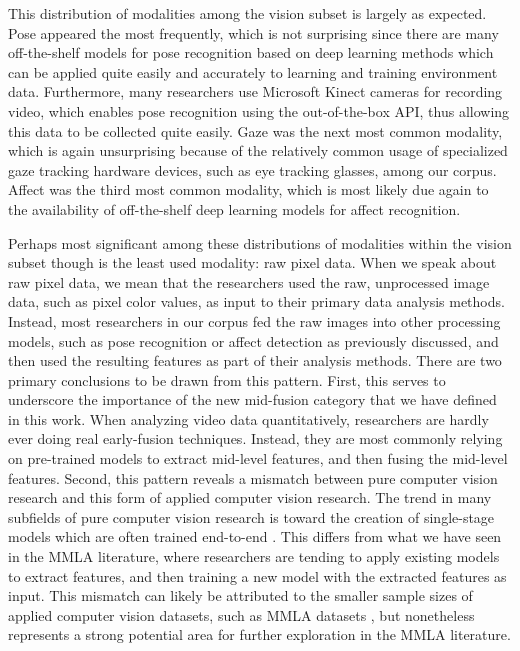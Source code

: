 \documentclass[manuscript,screen,review]{acmart}
\begin{document}
This distribution of modalities among the vision subset is largely as expected. Pose appeared the most frequently, which is not surprising since there are many off-the-shelf models for pose recognition based on deep learning methods which can be applied quite easily and accurately to learning and training environment data. Furthermore, many researchers use Microsoft Kinect cameras for recording video, which enables pose recognition using the out-of-the-box API, thus allowing this data to be collected quite easily. Gaze was the next most common modality, which is again unsurprising because of the relatively common usage of specialized gaze tracking hardware devices, such as eye tracking glasses, among our corpus. Affect was the third most common modality, which is most likely due again to the availability of off-the-shelf deep learning models for affect recognition. 

Perhaps most significant among these distributions of modalities within the vision subset though is the least used modality: raw pixel data. When we speak about raw pixel data, we mean that the researchers used the raw, unprocessed image data, such as pixel color values, as input to their primary data analysis methods. Instead, most researchers in our corpus fed the raw images into other processing models, such as pose recognition or affect detection as previously discussed, and then used the resulting features as part of their analysis methods. There are two primary conclusions to be drawn from this pattern. First, this serves to underscore the importance of the new mid-fusion category that we have defined in this work. When analyzing video data quantitatively, researchers are hardly ever doing real early-fusion techniques. Instead, they are most commonly relying on pre-trained models to extract mid-level features, and then fusing the mid-level features. Second, this pattern reveals a mismatch between pure computer vision research and this form of applied computer vision research. The trend in many subfields of pure computer vision research is toward the creation of single-stage models which are often trained end-to-end \cite{carranza2021}. This differs from what we have seen in the MMLA literature, where researchers are tending to apply existing models to extract features, and then training a new model with the extracted features as input. This mismatch can likely be attributed to the smaller sample sizes of applied computer vision datasets, such as MMLA datasets \cite{sharma_multimodal_2020}, but nonetheless represents a strong potential area for further exploration in the MMLA literature.
\end{document}
